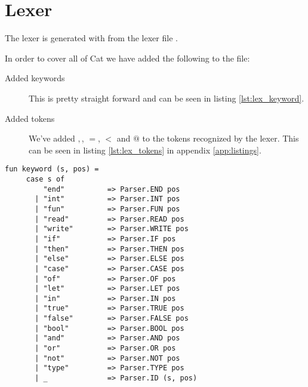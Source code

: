 \chapter{Lexer}
The lexer is generated with  from the lexer file
.

In order to cover all of Cat we have added the following to the file:

\begin{description}
\item [Added keywords] This is pretty straight forward and can be seen in
        listing \ref{lst:lex_keyword}.
\item [Added tokens] We've added $,$, $=$, $<$ and $@$ to the tokens recognized
        by the lexer. This can be seen in listing \ref{lst:lex_tokens} in
        appendix \ref{app:listings}.
\end{description}

\begin{lstlisting}
fun keyword (s, pos) =                     
     case s of                             
         "end"          => Parser.END pos
       | "int"          => Parser.INT pos
       | "fun"          => Parser.FUN pos
       | "read"         => Parser.READ pos
       | "write"        => Parser.WRITE pos
       | "if"           => Parser.IF pos
       | "then"         => Parser.THEN pos
       | "else"         => Parser.ELSE pos
       | "case"         => Parser.CASE pos
       | "of"           => Parser.OF pos
       | "let"          => Parser.LET pos
       | "in"           => Parser.IN pos
       | "true"         => Parser.TRUE pos
       | "false"        => Parser.FALSE pos
       | "bool"         => Parser.BOOL pos
       | "and"          => Parser.AND pos
       | "or"           => Parser.OR pos
       | "not"          => Parser.NOT pos
       | "type"         => Parser.TYPE pos
       | _              => Parser.ID (s, pos) 
\end{lstlisting}\label{lst:lex_keyword}
